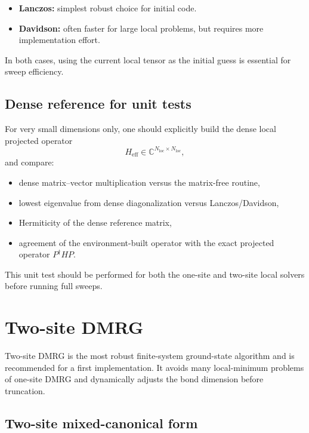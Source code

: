 \documentclass[aps,prb,onecolumn,nofootinbib]{revtex4-2}
\begin{document}
	\begin{itemize}
		\item \textbf{Lanczos:} simplest robust choice for initial code.
		\item \textbf{Davidson:} often faster for large local problems, but requires more implementation effort.
	\end{itemize}
	
	In both cases, using the current local tensor as the initial guess is essential for sweep efficiency.
	
	\subsection{Dense reference for unit tests}
	
	For very small dimensions only, one should explicitly build the dense local projected operator
	\[
	H_{\mathrm{eff}} \in \mathbb{C}^{N_{\mathrm{loc}}\times N_{\mathrm{loc}}},
	\]
	and compare:
	\begin{itemize}
		\item dense matrix--vector multiplication versus the matrix-free routine,
		\item lowest eigenvalue from dense diagonalization versus Lanczos/Davidson,
		\item Hermiticity of the dense reference matrix,
		\item agreement of the environment-built operator with the exact projected operator
		\(P^\dagger H P\).
	\end{itemize}
	
	This unit test should be performed for both the one-site and two-site local solvers before
	running full sweeps.
	
	\section{Two-site DMRG}
	
	Two-site DMRG is the most robust finite-system ground-state algorithm and is recommended for a first implementation. It avoids many local-minimum problems of one-site DMRG and dynamically adjusts the bond dimension before truncation.
	
	\subsection{Two-site mixed-canonical form}
	
\end{document}
